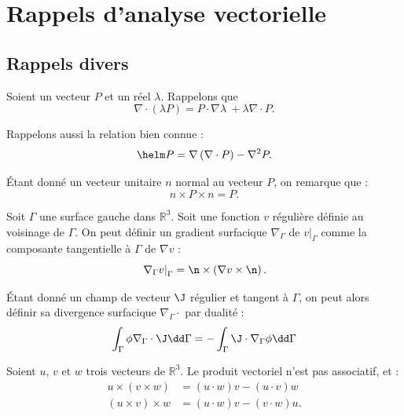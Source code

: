 
\chapter{Rappels d'analyse vectorielle}
\section{Rappels divers}
Soient un vecteur $P$ et un réel $\lambda$. Rappelons que 
\begin{equation}
\label{eq:div_scal}
\nabla\cdot(\lambda P) = P\cdot\nabla\lambda\ + \lambda\nabla\cdot P.
\end{equation}


Rappelons aussi la relation bien connue :
\begin{equation}
\label{eq:vect_id}
\helm P = \nabla\left(\nabla\cdot P\right)-\nabla^2P.
\end{equation}

\'Etant donné un vecteur unitaire $n$ normal au vecteur $P$, on remarque que :
\begin{equation}
	\label{eq:vect_normale}
	n\times P\times n = P.
\end{equation}

Soit $ \Gamma$ une surface gauche dans $\mathbb R^3$. Soit une fonction $v$ régulière définie au voisinage de $\Gamma$. On peut définir un gradient surfacique $\nabla_\Gamma$ de $v|_\Gamma$ comme la composante tangentielle à $\Gamma$ de $\nabla v$ :
\begin{equation}
    \left.\nabla_\Gamma v\right|_\Gamma = \n\times\left(\nabla v\times\n\right).
    \label{eq:gradsurf}
\end{equation}

\'Etant donné un champ de vecteur $\J$ régulier et tangent à $\Gamma$, on peut alors définir sa divergence surfacique $\nabla_\Gamma\cdot$ par dualité :
\begin{equation}
    \int_\Gamma\phi\nabla_\Gamma\cdot\J\dd\Gamma = - \int_\Gamma\J\cdot\nabla_\Gamma\phi\dd\Gamma
    \label{eq:divsurf}
\end{equation}

Soient $u$, $v$ et $w$ trois vecteurs de $\mathbb R^3$. Le produit vectoriel n'est pas associatif, et :
\begin{align}
    u\times(v\times w) &= (u\cdot w)v - (u\cdot v)w\\
    (u\times v)\times w &= (u\cdot w)v - (v\cdot w)u.
\end{align}

